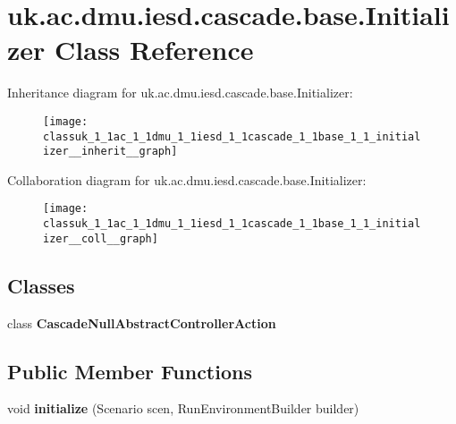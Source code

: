 \hypertarget{classuk_1_1ac_1_1dmu_1_1iesd_1_1cascade_1_1base_1_1_initializer}{\section{uk.\-ac.\-dmu.\-iesd.\-cascade.\-base.\-Initializer Class Reference}
\label{classuk_1_1ac_1_1dmu_1_1iesd_1_1cascade_1_1base_1_1_initializer}
}


Inheritance diagram for uk.\-ac.\-dmu.\-iesd.\-cascade.\-base.\-Initializer\-:\nopagebreak
\begin{figure}[H]
\begin{center}
\leavevmode
\texttt{[image: classuk\_1\_1ac\_1\_1dmu\_1\_1iesd\_1\_1cascade\_1\_1base\_1\_1\_initializer\_\_inherit\_\_graph]}
\end{center}
\end{figure}


Collaboration diagram for uk.\-ac.\-dmu.\-iesd.\-cascade.\-base.\-Initializer\-:\nopagebreak
\begin{figure}[H]
\begin{center}
\leavevmode
\texttt{[image: classuk\_1\_1ac\_1\_1dmu\_1\_1iesd\_1\_1cascade\_1\_1base\_1\_1\_initializer\_\_coll\_\_graph]}
\end{center}
\end{figure}
\subsection*{Classes}
\begin{DoxyCompactItemize}
\item 
class {\bfseries Cascade\-Null\-Abstract\-Controller\-Action}
\end{DoxyCompactItemize}
\subsection*{Public Member Functions}
\begin{DoxyCompactItemize}
\item 
\hypertarget{classuk_1_1ac_1_1dmu_1_1iesd_1_1cascade_1_1base_1_1_initializer_a385c7e438aff14f7e2c225f273ac1a08}{void {\bfseries initialize} (Scenario scen, Run\-Environment\-Builder builder)}\label{classuk_1_1ac_1_1dmu_1_1iesd_1_1cascade_1_1base_1_1_initializer_a385c7e438aff14f7e2c225f273ac1a08}

\end{DoxyCompactItemize}


